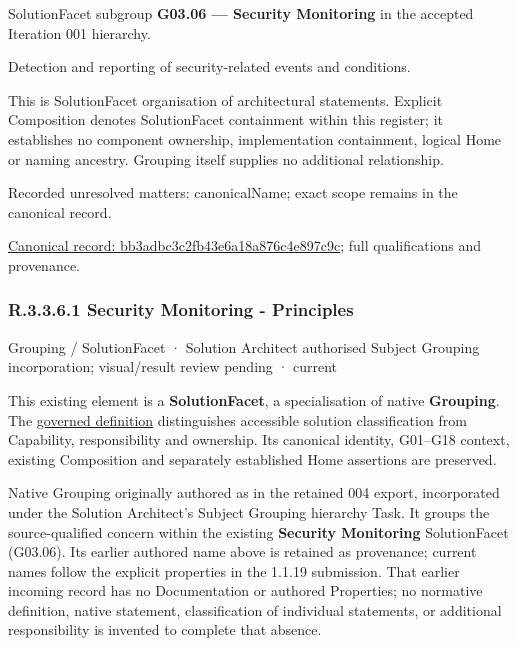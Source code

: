 SolutionFacet subgroup \textbf{G03.06 — Security Monitoring} in the accepted Iteration 001 hierarchy.



Detection and reporting of security-related events and conditions.



This is SolutionFacet organisation of architectural statements. Explicit Composition denotes SolutionFacet containment within this register; it establishes no component ownership, implementation containment, logical Home or naming ancestry. Grouping itself supplies no additional relationship.


{\small Recorded unresolved matters: canonicalName; exact scope remains in the canonical record.}\par
{\footnotesize \href{../../../../../../../continuum/grouping/bb3adbc3c2fb43e6a18a876c4e897c9c.md}{Canonical record: bb3adbc3c2fb43e6a18a876c4e897c9c}; full qualifications and provenance.}\par
\subsubsection*{R.3.3.6.1 Security Monitoring - Principles}
\label{navigation:R.3.3.6.1}

\label{element:2423108223e14d27a7bf59610034297a}
{\small Grouping / SolutionFacet · Solution Architect authorised Subject Grouping incorporation; visual/result review pending · current}\par

This existing element is a \textbf{SolutionFacet}, a specialisation of native
\textbf{Grouping}. The \href{\detokenize{../../../../../../../governance/continuum-representation.md#solutionfacet-classification--1119-candidate}}{governed definition}
distinguishes accessible solution classification from Capability, responsibility
and ownership. Its canonical identity, G01–G18 context, existing Composition
and separately established Home assertions are preserved.



Native Grouping originally authored as \texttt{} in the retained 004 export,
incorporated under the Solution Architect's Subject Grouping hierarchy Task.
It groups the source-qualified \texttt{} concern within
the existing \textbf{Security Monitoring} SolutionFacet (G03.06). Its earlier authored name above is retained as provenance; current names
follow the explicit properties in the 1.1.19 submission.
That earlier incoming record has no Documentation or authored Properties; no normative
definition, native statement, classification of individual statements, or
additional responsibility is invented to complete that absence.



